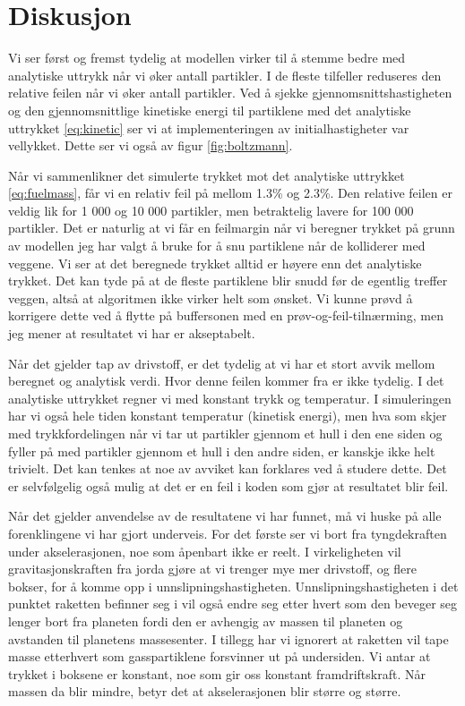 \documentclass[reprint,english,notitlepage]{revtex4-1}  %
\begin{document}
\section{Diskusjon}

Vi ser først og fremst tydelig at modellen virker til å stemme bedre med analytiske uttrykk
 når vi øker antall partikler. I de fleste tilfeller reduseres den relative feilen når vi øker antall partikler. Ved å sjekke gjennomsnittshastigheten og den gjennomsnittlige kinetiske energi til partiklene med det analytiske uttrykket \ref{eq:kinetic} ser vi at implementeringen av initialhastigheter var vellykket. Dette ser vi også av figur \ref{fig:boltzmann}.

Når vi sammenlikner det simulerte trykket mot det analytiske uttrykket \ref{eq:fuelmass},
 får vi en relativ feil på mellom 1.3\% og 2.3\%. Den relative feilen er veldig lik for 1 000 og 10 000 partikler, men betraktelig lavere for 100 000 partikler. Det er naturlig at vi får en feilmargin når vi beregner trykket på grunn av modellen jeg har valgt å bruke for å snu partiklene når de kolliderer med veggene. Vi ser at det beregnede trykket alltid er høyere enn det analytiske trykket. Det kan tyde på at de fleste partiklene blir snudd før de egentlig treffer veggen, altså at algoritmen ikke virker helt som ønsket. Vi kunne prøvd å korrigere dette ved å flytte på buffersonen med en prøv-og-feil-tilnærming, men jeg mener at resultatet vi har er akseptabelt.

Når det gjelder tap av drivstoff, er det tydelig at vi har et stort avvik mellom beregnet
 og analytisk verdi. Hvor denne feilen kommer fra er ikke tydelig. I det analytiske uttrykket regner vi med konstant trykk og temperatur. I simuleringen har vi også hele tiden konstant temperatur (kinetisk energi), men hva som skjer med trykkfordelingen når vi tar ut partikler gjennom et hull i den ene siden og fyller på med partikler gjennom et hull i den andre siden, er kanskje ikke helt trivielt. Det kan tenkes at noe av avviket kan forklares ved å studere dette. Det er selvfølgelig også mulig at det er en feil i koden som gjør at resultatet blir feil.

Når det gjelder anvendelse av de resultatene vi har funnet, må vi huske på alle
 forenklingene vi har gjort underveis. For det første ser vi bort fra tyngdekraften under akselerasjonen, noe som åpenbart ikke er reelt. I virkeligheten vil gravitasjonskraften fra jorda gjøre at vi trenger mye mer drivstoff, og flere bokser, for å komme opp i unnslipningshastigheten. Unnslipningshastigheten i det punktet raketten befinner seg i vil også endre seg etter hvert som den beveger seg lenger bort fra planeten fordi den er avhengig av massen til planeten og avstanden til planetens massesenter\citep{part1A}. I tillegg har vi ignorert at raketten vil tape masse etterhvert som gasspartiklene forsvinner ut på undersiden. Vi antar at trykket i boksene er konstant, noe som gir oss konstant framdriftskraft. Når massen da blir mindre, betyr det at akselerasjonen blir større og større.
\end{document}
